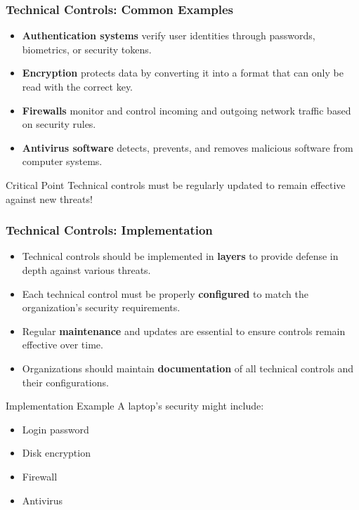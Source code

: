 \documentclass{beamer}
\begin{document}
\begin{frame}
    \frametitle{Technical Controls: Common Examples}
    
    \begin{itemize}
        \item \textbf{Authentication systems} verify user identities through passwords, biometrics, or security tokens.
        
        \item \textbf{Encryption} protects data by converting it into a format that can only be read with the correct key.
        
        \item \textbf{Firewalls} monitor and control incoming and outgoing network traffic based on security rules.
        
        \item \textbf{Antivirus software} detects, prevents, and removes malicious software from computer systems.
    \end{itemize}
    
    \begin{alertblock}{Critical Point}
        Technical controls must be regularly updated to remain effective against new threats!
    \end{alertblock}
\end{frame}

\begin{frame}
    \frametitle{Technical Controls: Implementation}
    
    \begin{itemize}
        \item Technical controls should be implemented in \textbf{layers} to provide defense in depth against various threats.
        
        \item Each technical control must be properly \textbf{configured} to match the organization's security requirements.
        
        \item Regular \textbf{maintenance} and updates are essential to ensure controls remain effective over time.
        
        \item Organizations should maintain \textbf{documentation} of all technical controls and their configurations.
    \end{itemize}
    
    \begin{exampleblock}{Implementation Example}
        A laptop's security might include:
        \begin{itemize}
            \item Login password
            \item Disk encryption
            \item Firewall
            \item Antivirus
        \end{itemize}
    \end{exampleblock}
\end{frame}
\end{document}
